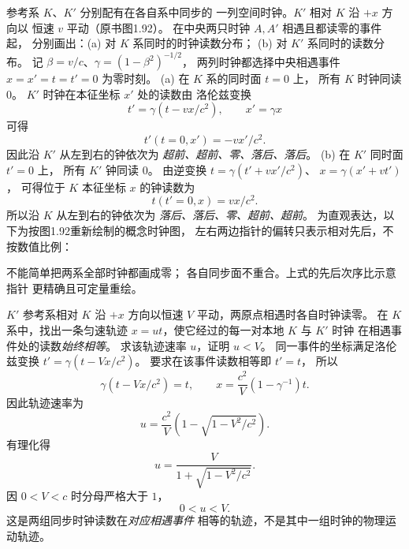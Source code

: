 参考系 $K$、$K'$ 分别配有在各自系中同步的
一列空间时钟。$K'$ 相对 $K$ 沿 $+x$ 方向以
恒速 $v$ 平动（原书图1.92）。
在中央两只时钟 $A,A'$ 相遇且都读零的事件起，
分别画出：(a) 对 $K$ 系同时的时钟读数分布；
(b) 对 $K'$ 系同时的读数分布。
\exsolution
记 $\beta=v/c$、$\gamma=(1-\beta^2)^{-1/2}$，
两列时钟都选择中央相遇事件
$x=x'=t=t'=0$ 为零时刻。
(a) 在 $K$ 系的同时面 $t=0$ 上，
所有 $K$ 时钟同读 $0$。
$K'$ 时钟在本征坐标 $x'$ 处的读数由
洛伦兹变换
\[
t'=\gamma(t-vx/c^2),\qquad x'=\gamma x
\]
可得
\[
\boxed{t'(t=0,x')=-vx'/c^2}.
\]
因此沿 $K'$ 从左到右的钟依次为
\emph{超前、超前、零、落后、落后}。
(b) 在 $K'$ 同时面 $t'=0$ 上，
所有 $K'$ 钟同读 $0$。
由逆变换
$t=\gamma(t'+vx'/c^2)$、
$x=\gamma(x'+vt')$，
可得位于 $K$ 本征坐标 $x$ 的钟读数为
\[
\boxed{t(t'=0,x)=vx/c^2}.
\]
所以沿 $K$ 从左到右的钟依次为
\emph{落后、落后、零、超前、超前}。
为直观表达，以下为按图1.92重新绘制的概念时钟图，
左右两边指针的偏转只表示相对先后，不按数值比例：
\begin{center}
\end{center}
\excheck 不能简单把两系全部时钟都画成零；
各自同步面不重合。上式的先后次序比示意指针
更精确且可定量重绘。

$K'$ 参考系相对 $K$ 沿 $+x$ 方向以恒速
$V$ 平动，两原点相遇时各自时钟读零。
在 $K$ 系中，找出一条匀速轨迹
$x=ut$，使它经过的每一对本地 $K$ 与 $K'$ 时钟
在相遇事件处的读数\emph{始终相等}。
求该轨迹速率 $u$，证明 $u<V$。
\exsolution
同一事件的坐标满足洛伦兹变换
$t'=\gamma(t-Vx/c^2)$。
要求在该事件读数相等即 $t'=t$，
所以
\[
\gamma(t-Vx/c^2)=t,
\qquad
x=\frac{c^2}{V}(1-\gamma^{-1})t.
\]
因此轨迹速率为
\[
\boxed{u=\frac{c^2}{V}
\left(1-\sqrt{1-V^2/c^2}\right)}.
\]
有理化得
\[
u=\frac{V}{1+\sqrt{1-V^2/c^2}}.
\]
因 $0<V<c$ 时分母严格大于 $1$，
\[
\boxed{0<u<V}.
\]
\excheck 这是两组同步时钟读数在\emph{对应相遇事件}
相等的轨迹，不是其中一组时钟的物理运动轨迹。

